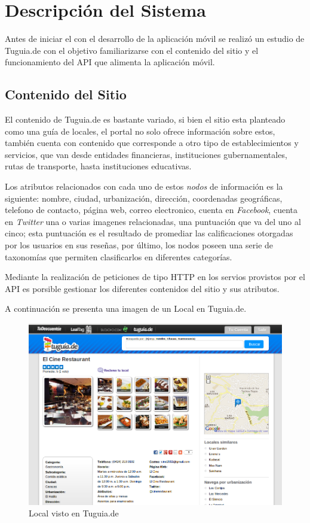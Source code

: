 \section{Descripción del Sistema} \label{subsect:descripcion}
Antes de iniciar el con el desarrollo de la aplicación móvil se realizó un estudio de Tuguia.de con el objetivo familiarizarse con el contenido del sitio y el funcionamiento del API que alimenta la aplicación móvil.

\subsection{Contenido del Sitio}
El contenido de Tuguia.de es bastante variado, si bien el sitio esta planteado como una guía de locales, el portal no solo ofrece información sobre estos, también cuenta con contenido que corresponde a otro tipo de establecimientos y servicios, que van desde entidades financieras, instituciones gubernamentales, rutas de transporte, hasta  instituciones educativas. 

Los atributos relacionados con cada uno de estos \textit{nodos} de información es la siguiente: nombre, ciudad, urbanización, dirección, coordenadas geográficas, telefono de contacto, página web, correo electronico, cuenta en \textit{Facebook}, cuenta en \textit{Twitter} una o varias imagenes relacionadas, una puntuación que va del uno al cinco; esta puntuación es el resultado de promediar las calificaciones otorgadas por los usuarios en sus reseñas, por último, los nodos poseen una serie de taxonomías que permiten clasificarlos en diferentes categorías. 

Mediante la realización de peticiones de tipo HTTP en los servios provistos por el API es porsible gestionar los diferentes contenidos del sitio y sus atributos.

A continuación se presenta una imagen de un Local en Tuguia.de.

\begin{figure}[h]
	\begin{center}
		\includegraphics[scale=0.4]{imagenes/local_tgd.png}
	\end{center}
	\caption{
		\label{fig:localtgd}
		Local visto en Tuguia.de \cite{CTGD}
	}
\end{figure}


